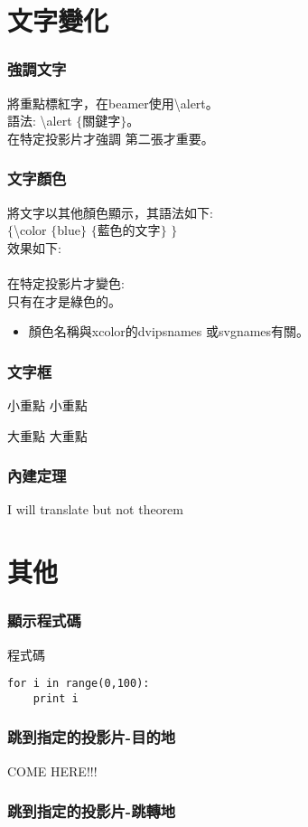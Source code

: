 \documentclass[xcolor=svgnames]{beamer}
\begin{document}
\section{文字變化}
\begin{frame}
\frametitle{強調文字} %
將重點標紅字，在beamer使用\alert{\textbackslash alert}。\\ 
語法:
\textbackslash alert $\lbrace$關鍵字$\rbrace$。\\ 
在特定投影片才強調  
\alert<2>{第二張}才重要。  
\end{frame}
\begin{frame}
\frametitle{文字顏色} %
將文字以其他顏色顯示，其語法如下:\\
$\lbrace$\textbackslash color $\lbrace$blue$\rbrace$ $\lbrace$藍色的文字$\rbrace$ $\rbrace$\\
效果如下:\\
{\color{blue}{藍色的文字}}\\[10pt]
在特定投影片才變色:\\
只有在{}才是綠色的。\\
\begin{itemize}
\item 顏色名稱與xcolor的dvipsnames 或svgnames有關。
\end{itemize}
\end{frame}
\begin{frame}
\frametitle{文字框} %
\begin{block}{小重點}
小重點
\end{block}

\begin{alertblock}{大重點}
大重點
\end{alertblock}
\end{frame}
\begin{frame}
\frametitle{內建定理}
\begin{theorem}
I will translate  but not theorem
\end{theorem}
\end{frame}
\section{其他}
\begin{frame}[fragile]
\frametitle{顯示程式碼}
\begin{block}{程式碼}
\begin{verbatim}
for i in range(0,100):
    print i
\end{verbatim}
\end{block}
\end{frame}
\begin{frame}[label=here]
\frametitle{跳到指定的投影片-目的地}
COME HERE!!!
\end{frame}
\begin{frame}
\frametitle{跳到指定的投影片-跳轉地}
\hyperlink{here}{}
\end{frame}
\end{document}
